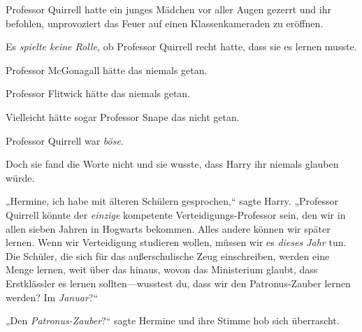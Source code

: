 Professor Quirrell hatte ein junges Mädchen vor aller Augen gezerrt und ihr befohlen, unprovoziert das Feuer auf einen Klassenkameraden zu eröffnen.

Es \emph{spielte keine Rolle,} ob Professor Quirrell recht hatte, dass sie es lernen musste.

Professor McGonagall hätte das niemals getan.

Professor Flitwick hätte das niemals getan.

Vielleicht hätte sogar Professor Snape das nicht getan.

Professor Quirrell war \emph{böse}.

Doch sie fand die Worte nicht und sie wusste, dass Harry ihr niemals glauben würde.

„Hermine, ich habe mit älteren Schülern gesprochen,“ sagte Harry. „Professor Quirrell könnte der \emph{einzige} kompetente Verteidigungs-Professor sein, den wir in allen sieben Jahren in Hogwarts bekommen. Alles andere können wir später lernen. Wenn wir Verteidigung studieren wollen, müssen wir es \emph{dieses Jahr} tun. Die Schüler, die sich für das außerschulische Zeug einschreiben, werden eine Menge lernen, weit über das hinaus, wovon das Ministerium glaubt, dass Erstklässler es lernen sollten—wusstest du, dass wir den Patronus-Zauber lernen werden? Im \emph{Januar}?“

„Den \emph{Patronus-Zauber}?“ sagte Hermine und ihre Stimme hob sich überrascht.

